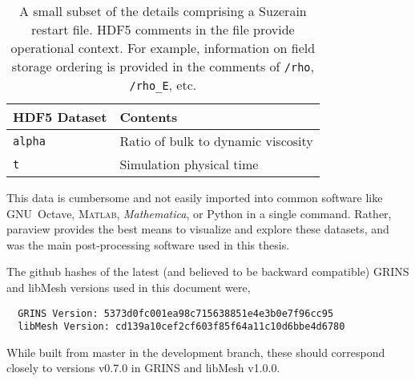 \begin{table}
\centering
\caption[Instantaneous fields and other details comprising a restart file]{%
  A small subset of the details comprising a Suzerain restart file.
  HDF5 comments in the file provide operational context.  For example,
  information on field storage ordering is provided in the comments of
  \texttt{/rho}, \texttt{/rho\_E}, etc.\label{tbl:restartfile}
}
\begin{small}
\begin{tabular}{p{}|p{}}
HDF5 Dataset & Contents \\ \hline \hline
\texttt{alpha                 } & Ratio of bulk to dynamic viscosity \\
\texttt{t                     } & Simulation physical time 
\end{tabular}
\end{small}
\end{table}

This data is cumbersome and not easily imported into common software
like GNU~Octave, \textsc{Matlab}\textsuperscript{\textregistered},
\textit{Mathematica}\textsuperscript{\textregistered}, or Python in a
single command. Rather, paraview provides the best means to visualize
and explore these datasets, and was the main post-processing software
used in this thesis. 

The github hashes of the latest (and believed to be backward compatible)
GRINS and libMesh versions used in this document were, 
\begin{verbatim}
  GRINS Version: 5373d0fc001ea98c715638851e4e3b0e7f96cc95                                                  
  libMesh Version: cd139a10cef2cf603f85f64a11c10d6bbe4d6780
\end{verbatim}
%
While built from master in the development branch, these should
correspond closely to versions v0.7.0 in GRINS and libMesh v1.0.0.  

